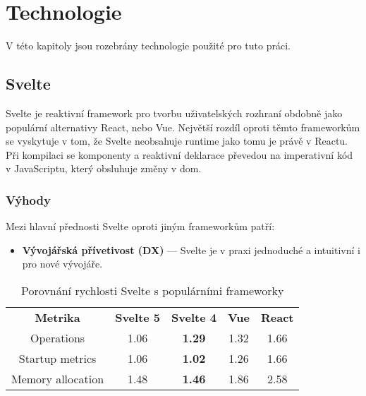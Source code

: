 \chapter{Technologie}

V této kapitoly jsou rozebrány technologie použité pro tuto práci.

\section{Svelte}\label{sec:Svelte}

Svelte je reaktivní framework pro tvorbu uživatelských rozhraní obdobně jako populární alternativy React, nebo Vue.
Největší rozdíl oproti těmto frameworkům se vyskytuje v tom, že Svelte neobsahuje runtime jako tomu je právě v Reactu.
Při kompilaci se komponenty a reaktivní deklarace převedou na imperativní kód v JavaScriptu, který obsluhuje změny v \gls{dom}.

\subsection{Výhody}

Mezi hlavní přednosti Svelte oproti jiným frameworkům patří:

\begin{itemize}
    \item \textbf{Vývojářská přívetivost (DX)} --- Svelte je v praxi jednoduché a intuitivní i pro nové vývojáře.
\end{itemize}


\begin{table}[ht]
    \begin{tabular}{c|c|c|c|c}
        \bfseries Metrika & \bfseries{Svelte 5} & \bfseries{Svelte 4} & \bfseries{Vue} & \bfseries{React} \\\Midrule{}
        Operations        & 1.06                & \textbf{1.29}       & 1.32           & 1.66             \\
        Startup metrics   & 1.06                & \textbf{1.02}       & 1.26           & 1.66             \\
        Memory allocation & 1.48                & \textbf{1.46}       & 1.86           & 2.58
    \end{tabular}
    \caption{Porovnání rychlosti Svelte s populárními frameworky}
    \label{tab:foobar}
\end{table}

